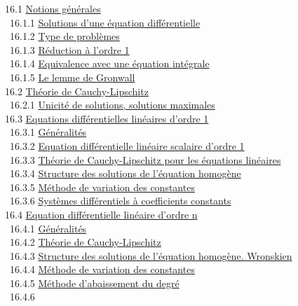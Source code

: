 \documentclass[]{article}
\begin{document}
~16.1 \href{coursse86.html\#x105-47100016.1}{Notions générales} \\
~~16.1.1 \href{coursse86.html\#x105-47200016.1.1}{Solutions d'une
équation différentielle} \\ ~~16.1.2
\href{coursse86.html\#x105-47300016.1.2}{Type de problèmes} \\ ~~16.1.3
\href{coursse86.html\#x105-47400016.1.3}{Réduction à l'ordre 1} \\
~~16.1.4 \href{coursse86.html\#x105-47500016.1.4}{Equivalence avec une
équation intégrale} \\ ~~16.1.5
\href{coursse86.html\#x105-47600016.1.5}{Le lemme de Gronwall} \\ ~16.2
\href{coursse87.html\#x106-47700016.2}{Théorie de Cauchy-Lipschitz} \\
~~16.2.1 \href{coursse87.html\#x106-47800016.2.1}{Unicité de solutions,
solutions maximales} \\ ~16.3
\href{coursse88.html\#x107-47900016.3}{Equations différentielles
linéaires d'ordre 1} \\ ~~16.3.1
\href{coursse88.html\#x107-48000016.3.1}{Généralités} \\ ~~16.3.2
\href{coursse88.html\#x107-48100016.3.2}{Equation différentielle
linéaire scalaire d'ordre 1} \\ ~~16.3.3
\href{coursse88.html\#x107-48200016.3.3}{Théorie de Cauchy-Lipschitz
pour les équations linéaires} \\ ~~16.3.4
\href{coursse88.html\#x107-48300016.3.4}{Structure des solutions de
l'équation homogène} \\ ~~16.3.5
\href{coursse88.html\#x107-48400016.3.5}{Méthode de variation des
constantes} \\ ~~16.3.6
\href{coursse88.html\#x107-48500016.3.6}{Systèmes différentiels à
coefficients constants} \\ ~16.4
\href{coursse89.html\#x108-48600016.4}{Equation différentielle linéaire
d'ordre n} \\ ~~16.4.1
\href{coursse89.html\#x108-48700016.4.1}{Généralités} \\ ~~16.4.2
\href{coursse89.html\#x108-48800016.4.2}{Théorie de Cauchy-Lipschitz} \\
~~16.4.3 \href{coursse89.html\#x108-48900016.4.3}{Structure des
solutions de l'équation homogène. Wronskien} \\ ~~16.4.4
\href{coursse89.html\#x108-49000016.4.4}{Méthode de variation des
constantes} \\ ~~16.4.5 \href{coursse89.html\#x108-49100016.4.5}{Méthode
d'abaissement du degré} \\ ~~16.4.6
\end{document}
